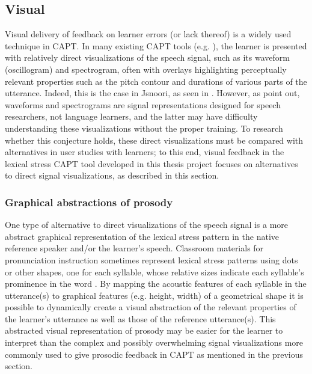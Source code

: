 		
	
		\subsection{Visual }
		
		Visual delivery of feedback on learner errors (or lack thereof) is a widely used technique in CAPT.
	In many existing CAPT tools %
	(e.g. \cite{Martin2004,Henry2007}),
the learner is presented with relatively direct visualizations of the speech signal, such as its waveform (oscillogram) and spectrogram, often with overlays highlighting perceptually relevant properties such as the pitch contour and durations of various parts of the utterance. 
	Indeed, this is the case in Jsnoori, as seen in .
	However, as \textcite{Neri2002} point out, waveforms and spectrograms are signal representations designed for speech researchers, not language learners, and the latter may have difficulty understanding these visualizations without the proper training. To research whether this conjecture holds, these direct visualizations must be compared with alternatives in user studies with learners; to this end, visual feedback in the lexical stress CAPT tool developed in this thesis project focuses on alternatives to direct signal visualizations, as described in this section.	
		
			\subsubsection{Graphical abstractions of prosody}
			\label{sec:implicit:visual:graphical}
			
			One type of alternative to direct visualizations of the speech signal is a more abstract graphical representation of the lexical stress pattern in the native reference speaker and/or the learner's speech. Classroom materials for pronunciation instruction sometimes represent lexical stress patterns using dots or other shapes, one for each syllable, whose relative sizes indicate each syllable's prominence in the word \citep{Hirschfeld1998}. By mapping the acoustic features of each syllable in the utterance(s) to graphical features (e.g. height, width) of a geometrical shape
			it is possible to dynamically create a visual abstraction of the relevant properties of the learner's utterance as well as those of the reference utterance(s). This abstracted visual representation of prosody may be easier for the learner to interpret than the complex and possibly overwhelming signal visualizations more commonly used to give prosodic feedback in CAPT as mentioned in the previous section.
			
